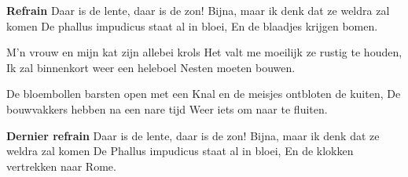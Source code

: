 \footnotemark [
ititle={Vrolijk lentelied, een}]


\beginchorus
\textbf{Refrain}
Daar is de lente, daar is de zon!
Bijna, maar ik denk dat ze weldra zal komen
De phallus impudicus staat al in bloei,
En de blaadjes krijgen bomen.
\endchorus

\beginverse
M'n vrouw en mijn kat zijn allebei krols
Het valt me moeilijk ze rustig te houden,
Ik zal binnenkort weer een heleboel
Nesten moeten bouwen.
\endverse

\beginvere
De bloembollen barsten open met een 
Knal en de meisjes ontbloten de kuiten,
De bouwvakkers hebben na een nare tijd
Weer iets om naar te fluiten.
\endverse

\beginchorus
\textbf{Dernier refrain}
Daar is de lente, daar is de zon!
Bijna, maar ik denk dat ze weldra zal komen
De Phallus impudicus staat al in bloei,
En de klokken vertrekken naar Rome.
\endchorus
\endsong